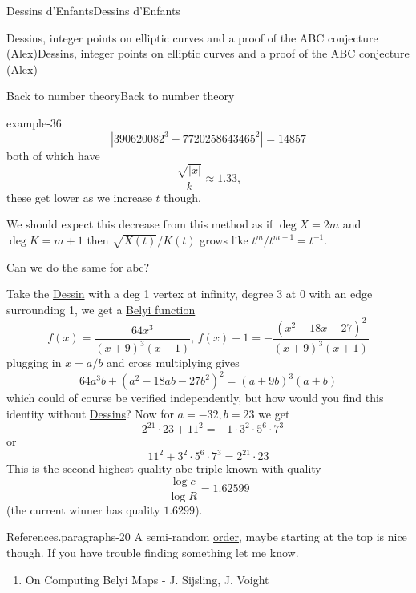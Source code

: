 \documentclass[10pt,]{book}
\numberwithin{equation}{section}
\newcommand{\inv}{^{-1}}
\begin{document}
\begin{chapterptx}{Dessins d'Enfants}{}{Dessins d'Enfants}{}{}
\begin{sectionptx}{Dessins, integer points on elliptic curves and a proof of the ABC conjecture (Alex)}{}{Dessins, integer points on elliptic curves and a proof of the ABC conjecture (Alex)}{}{}
\begin{subsectionptx}{Back to number theory}{}{Back to number theory}{}{}
\begin{example}{}{example-36}
\begin{equation*}
\end{equation*}
%
\begin{equation*}
|390620082^3 - 7720258643465^2| = 14857
\end{equation*}
both of which have%
\begin{equation*}
\frac{\sqrt{|x|}}{k} \approx 1.33\text{,}
\end{equation*}
these get lower as we increase \(t\) though.%
\end{example}
\hypertarget{p-731}{}%
We should expect this decrease from this method as if \(\deg X = 2m\) and \(\deg K = m + 1\) then \(\sqrt{X(t)}/K(t)\) grows like \(t^{m}/t^{m+1} = t\inv\).%
\par
\hypertarget{p-732}{}%
Can we do the same for abc?%
\par
\hypertarget{p-733}{}%
Take the \hyperref[def-dessin-denfant]{Dessin} with a deg 1 vertex at infinity, degree 3 at 0 with an edge surrounding 1, we get a \hyperref[def-belyi-function]{Belyi function}%
\begin{equation*}
f(x) = \frac{64x^3}{(x+9)^3 (x+1)},\,f(x) - 1 = -\frac{(x^2 - 18x -27)^2}{(x+9)^3(x+1)}
\end{equation*}
plugging in \(x=a/b\) and cross multiplying gives%
\begin{equation*}
64a^3 b + (a^2 - 18ab - 27b^2)^2 = (a+9b)^3(a+b)
\end{equation*}
which could of course be verified independently, but how would you find this identity without \hyperref[def-dessin-denfant]{Dessins}? Now for \(a = -32, b= 23\) we get%
\begin{equation*}
- 2^{21} \cdot 23 +  11^2 =  -1 \cdot 3^2 \cdot 5^6 \cdot 7^3
\end{equation*}
or%
\begin{equation*}
11^2 + 3^2 \cdot 5^6 \cdot 7^3 = 2^{21} \cdot 23
\end{equation*}
This is the second highest quality abc triple known with quality%
\begin{equation*}
\frac{\log c}{\log R} = 1.62599
\end{equation*}
(the current winner has quality \(1.6299\)).%
\begin{paragraphs}{References.}{paragraphs-20}%
\hypertarget{p-734}{}%
A semi-random \hyperref[def-order-quaternion]{order}, maybe starting at the top is nice though. If you have trouble finding something let me know.\leavevmode%
\begin{enumerate}
\item\hypertarget{li-150}{}On Computing Belyi Maps - J. Sijsling, J. Voight%

\end{enumerate}
\end{paragraphs}
\end{subsectionptx}
\end{sectionptx}
\end{chapterptx}
\end{document}
